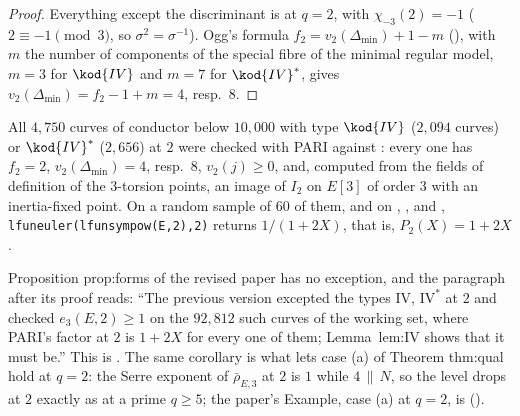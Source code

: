 \begin{proof}
Everything except the discriminant is  at $q=2$, with $\chi_{-3}(2)=-1$ ($2\equiv-1\pmod3$, so $\sigma^2=\sigma^{-1}$). Ogg's formula
$f_2=v_2(\Delta_{\min})+1-m$ (), with $m$ the number of components of the special fibre of the minimal regular model, $m=3$ for
$\kod{IV}$ and $m=7$ for $\kod{IV}^*$, gives $v_2(\Delta_{\min})=f_2-1+m=4$, resp.\ $8$.
\end{proof}

All $4{,}750$ curves of conductor below $10{,}000$ with type $\kod{IV}$ ($2{,}094$ curves) or $\kod{IV}^*$ ($2{,}656$) at $2$ were checked with PARI against
: every one has $f_2=2$, $v_2(\Delta_{\min})=4$, resp.\ $8$, $v_2(j)\ge0$, and, computed from the fields of definition of the
$3$-torsion points, an image of $I_2$ on $E[3]$ of order $3$ with an inertia-fixed point. On a random sample of $60$ of them, and on ,
,  and , \texttt{lfuneuler(lfunsympow(E,2),2)} returns $1/(1+2X)$, that is, $P_2(X)=1+2X$.

\begin{paperlink}
Proposition prop:forms of the revised paper has no exception, and the paragraph after its proof reads: ``The previous version excepted the types
$\mathrm{IV}$, $\mathrm{IV}^*$ at $2$ and checked $e_3(E,2)\ge1$ on the $92{,}812$ such curves of the working set, where PARI's factor at $2$ is
$1+2X$ for every one of them; Lemma~lem:IV shows that it must be.'' This is . The same corollary is what lets case
(a) of Theorem thm:qual hold at $q=2$: the Serre exponent of $\bar\rho_{E,3}$ at $2$ is $1$ while $4\,\|\,N$, so the level drops at $2$ exactly as at a prime
$q\ge5$; the paper's Example, case (a) at $q=2$, is  ().
\end{paperlink}

